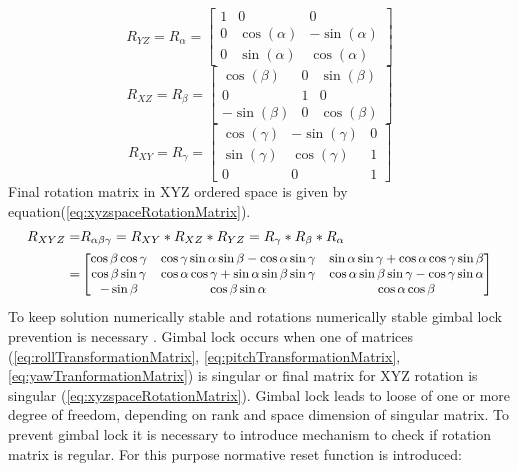 \begin{equation}\label{eq:rollTransformationMatrix}
    R_{YZ} = R_\alpha =
    \begin{bmatrix}
        1 & 0 & 0\\
        0 & \cos(\alpha) & -\sin(\alpha)\\
        0 & \sin(\alpha) & \cos(\alpha)
    \end{bmatrix}
\end{equation}
\begin{equation}\label{eq:pitchTransformationMatrix}
    R_{XZ} = R_\beta =
    \begin{bmatrix}
        \cos(\beta) & 0 & \sin(\beta)\\
        0 & 1 & 0\\
        -\sin(\beta) & 0 & \cos(\beta)
    \end{bmatrix}
\end{equation}
\begin{equation}\label{eq:yawTranformationMatrix}
    R_{XY} = R_\gamma = 
    \begin{bmatrix}
        \cos(\gamma) & -\sin(\gamma) & 0 \\
        \sin(\gamma) & \cos(\gamma) & 1 \\
        0 & 0 & 1
    \end{bmatrix}
\end{equation}
Final rotation matrix in XYZ ordered space is given by equation(\ref{eq:xyzspaceRotationMatrix}).
\begin{equation}\label{eq:xyzspaceRotationMatrix}
    \begin{aligned}
        R_{XYZ}  =& R_{\alpha\beta\gamma} =  R_{XY} * R_{XZ} * R_{YZ} = R_\gamma * R_\beta *R_\alpha\\
         =& 
         \small
         \begin{bmatrix}
            \cos\beta\cos\gamma & \cos\gamma\sin\alpha\sin\beta - \cos\alpha\sin\gamma & \sin\alpha\sin\gamma + \cos\alpha\cos\gamma\sin\beta \\
            \cos\beta\sin\gamma & \cos\alpha\cos\gamma + \sin\alpha\sin\beta\sin\gamma & \cos\alpha\sin\beta\sin\gamma - \cos\gamma\sin\alpha \\
            -\sin\beta & \cos\beta\sin\alpha & \cos\alpha\cos\beta 
         \end{bmatrix}
         \normalsize
    \end{aligned}
\end{equation}
To keep solution numerically stable and rotations numerically stable gimbal lock prevention is necessary \cite{kramer1977gyro}. Gimbal lock occurs when one of matrices (\ref{eq:rollTransformationMatrix}, \ref{eq:pitchTransformationMatrix}, \ref{eq:yawTranformationMatrix}) is singular or final matrix for XYZ rotation is singular (\ref{eq:xyzspaceRotationMatrix}). Gimbal lock leads to loose of one or more degree of freedom, depending on rank and space dimension of singular matrix. To prevent gimbal lock it is necessary to introduce mechanism to check if rotation matrix is regular. For this purpose normative reset function is introduced:
